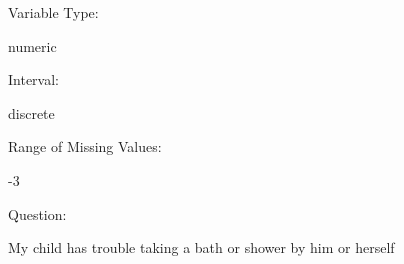 \documentclass[
]{article}
\begin{document}
\begin{minipage}[t]{0.3\linewidth}

Variable Type:

\end{minipage}%
\begin{minipage}[t]{0.7\linewidth}

numeric

\end{minipage}

\begin{minipage}[t]{0.3\linewidth}

Interval:

\end{minipage}%
\begin{minipage}[t]{0.7\linewidth}

discrete

\end{minipage}

\begin{minipage}[t]{0.3\linewidth}

Range of Missing Values:

\end{minipage}%
\begin{minipage}[t]{0.7\linewidth}

-3

\end{minipage}

\begin{minipage}[t]{0.3\linewidth}

Question:

\end{minipage}%
\begin{minipage}[t]{0.7\linewidth}

My child has trouble taking a bath or shower by him or herself

\end{minipage}
\end{document}

